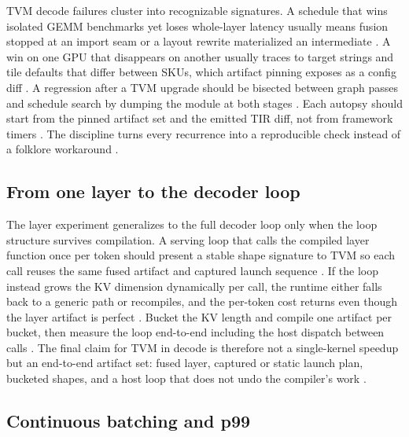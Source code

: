 TVM decode failures cluster into recognizable signatures. A schedule that wins isolated GEMM benchmarks yet loses whole-layer latency usually means fusion stopped at an import seam or a layout rewrite materialized an intermediate \citep{lai2023relax,memoryfloor2026}. A win on one GPU that disappears on another usually traces to target strings and tile defaults that differ between SKUs, which artifact pinning exposes as a config diff \citep{chen2018tvm,nvidia2022hopper}. A regression after a TVM upgrade should be bisected between graph passes and schedule search by dumping the module at both stages \citep{chen2020compilerbasedhardw,patel2025llminference}. Each autopsy should start from the pinned artifact set and the emitted TIR diff, not from framework timers \citep{memoryfloor2026,chen2018tvm}. The discipline turns every recurrence into a reproducible check instead of a folklore workaround \citep{taxbreak2026,yirage2026}.

\subsection{From one layer to the decoder loop}

The layer experiment generalizes to the full decoder loop only when the loop structure survives compilation. A serving loop that calls the compiled layer function once per token should present a stable shape signature to TVM so each call reuses the same fused artifact and captured launch sequence \citep{dao2022flashattention,kwon2023vllm}. If the loop instead grows the KV dimension dynamically per call, the runtime either falls back to a generic path or recompiles, and the per-token cost returns even though the layer artifact is perfect \citep{patel2025llminference,taxbreak2026}. Bucket the KV length and compile one artifact per bucket, then measure the loop end-to-end including the host dispatch between calls \citep{memoryfloor2026,nvidia2024cudagraphs}. The final claim for TVM in decode is therefore not a single-kernel speedup but an end-to-end artifact set: fused layer, captured or static launch plan, bucketed shapes, and a host loop that does not undo the compiler's work \citep{chen2018tvm,memoryfloor2026,patel2025llminference}.

\subsection{Continuous batching and p99}

